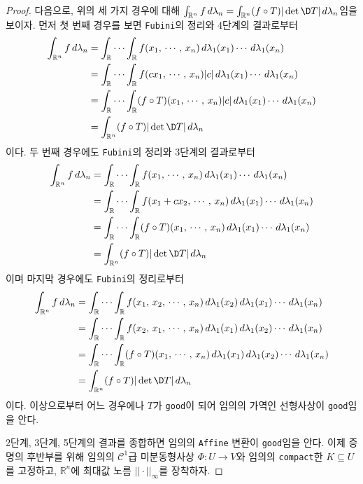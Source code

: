 \begin{proof}
    다음으로, 위의 세 가지 경우에 대해 $\int_{\mathbb{R}^n}f\,d\lambda_n=\int_{\mathbb{R}^n}(f\circ T)|\det\D T|\,d\lambda_n$임을 보이자. 먼저 첫 번째 경우를 보면 \texttt{Fubini}의 정리와 4단계의 결과로부터
    \begin{align*}
        \int_{\mathbb{R}^n}f\,d\lambda_n&=\int_\mathbb{R}\cdots\int_\mathbb{R}f(x_1,\,\cdots,\,x_n)\,d\lambda_1(x_1)\cdots\,d\lambda_1(x_n)\\
        &=\int_\mathbb{R}\cdots\int_\mathbb{R}f(cx_1,\,\cdots,\,x_n)|c|\,d\lambda_1(x_1)\cdots\,d\lambda_1(x_n)\\
        &=\int_\mathbb{R}\cdots\int_\mathbb{R}(f\circ T)(x_1,\,\cdots,\,x_n)|c|\,d\lambda_1(x_1)\cdots\,d\lambda_1(x_n)\\
        &=\int_{\mathbb{R}^n}(f\circ T)|\det\D T|\,d\lambda_n
    \end{align*}
    이다. 두 번째 경우에도 \texttt{Fubini}의 정리와 3단계의 결과로부터
    \begin{align*}
        \int_{\mathbb{R}^n}f\,d\lambda_n&=\int_\mathbb{R}\cdots\int_\mathbb{R}f(x_1,\,\cdots,\,x_n)\,d\lambda_1(x_1)\cdots\,d\lambda_1(x_n)\\
        &=\int_\mathbb{R}\cdots\int_\mathbb{R}f(x_1+cx_2,\,\cdots,\,x_n)\,d\lambda_1(x_1)\cdots\,d\lambda_1(x_n)\\
        &=\int_\mathbb{R}\cdots\int_\mathbb{R}(f\circ T)(x_1,\,\cdots,\,x_n)\,d\lambda_1(x_1)\cdots\,d\lambda_1(x_n)\\
        &=\int_{\mathbb{R}^n}(f\circ T)|\det\D T|\,d\lambda_n
    \end{align*}
    이며 마지막 경우에도 \texttt{Fubini}의 정리로부터
    \begin{align*}
        \int_{\mathbb{R}^n}f\,d\lambda_n&=\int_\mathbb{R}\cdots\int_\mathbb{R}f(x_1,\,x_2,\,\cdots,\,x_n)\,d\lambda_1(x_2)\,d\lambda_1(x_1)\cdots\,d\lambda_1(x_n)\\
        &=\int_\mathbb{R}\cdots\int_\mathbb{R}f(x_2,\,x_1,\,\cdots,\,x_n)\,d\lambda_1(x_1)\,d\lambda_1(x_2)\cdots\,d\lambda_1(x_n)\\
        &=\int_\mathbb{R}\cdots\int_\mathbb{R}(f\circ T)(x_1,\,\cdots,\,x_n)\,d\lambda_1(x_1)\,d\lambda_1(x_2)\cdots\,d\lambda_1(x_n)\\
        &=\int_{\mathbb{R}^n}(f\circ T)|\det\D T|\,d\lambda_n
    \end{align*}
    이다. 이상으로부터 어느 경우에나 $T$가 \texttt{good}이 되어 임의의 가역인 선형사상이 \texttt{good}임을 안다.

    2단계, 3단계, 5단계의 결과를 종합하면 임의의 \texttt{Affine} 변환이 \texttt{good}임을 안다. 이제 증명의 후반부를 위해 임의의 $\mathcal{C}^1$급 미분동형사상 $\Phi:U\to V$와 임의의 \texttt{compact}한 $K\subseteq U$를 고정하고, $\mathbb{R}^n$에 최대값 노름 $||\cdot||_\infty$를 장착하자.


\end{proof}
